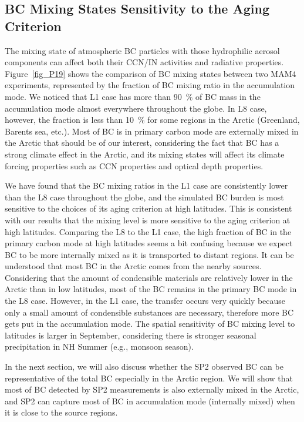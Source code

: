 \documentclass[12pt, fullpage]{uiucthesis2009}
\begin{document}
	\subsection{BC Mixing States Sensitivity to the Aging Criterion} 
	The mixing state of atmospheric BC particles with those hydrophilic aerosol components can affect both their CCN/IN activities and radiative properties. Figure~\ref{fig_P19} shows the comparison of BC mixing states between two MAM4 experiments, represented by the fraction of BC mixing ratio in the accumulation mode. We noticed that L1 case has more than 90~$\%$ of BC mass in the accumulation mode almost everywhere throughout the globe. In L8 case, however, the fraction is less than 10~$\%$ for some regions in the Arctic (Greenland, Barents sea, etc.). Most of BC is in primary carbon mode are externally mixed in the Arctic that should be of our interest, considering the fact that BC has a strong climate effect in the Arctic, and its mixing states will affect its climate forcing properties such as CCN properties and optical depth properties.  
	
	We have found that the BC mixing ratios in the L1 case are consistently lower than the L8 case throughout the globe, and the simulated BC burden is most sensitive to the choices of its aging criterion at high latitudes. This is consistent with our results that the mixing level is more sensitive to the aging criterion at high latitudes. Comparing the L8 to the L1 case, the high fraction of BC in the primary carbon mode at high latitudes seems a bit confusing because we expect BC to be more internally mixed as it is transported to distant regions. It can be understood that most BC in the Arctic comes from the nearby sources. Considering that the amount of condensible materials are relatively lower in the Arctic than in low latitudes, most of the BC remains in the primary BC mode in the L8 case. However, in the L1 case, the transfer occurs very quickly because only a small amount of condensible substances are necessary, therefore more BC gets put in the accumulation mode. The spatial sensitivity of BC mixing level to latitudes is larger in September, considering there is stronger seasonal precipitation in NH Summer (e.g., monsoon season). 
	
	In the next section, we will also discuss whether the SP2 observed BC can be representative of the total BC especially in the Arctic region. We will show that most of BC detected by SP2 measurements is also externally mixed in the Arctic, and SP2 can capture most of BC in accumulation mode (internally mixed) when it is close to the source regions.
	
\end{document}
